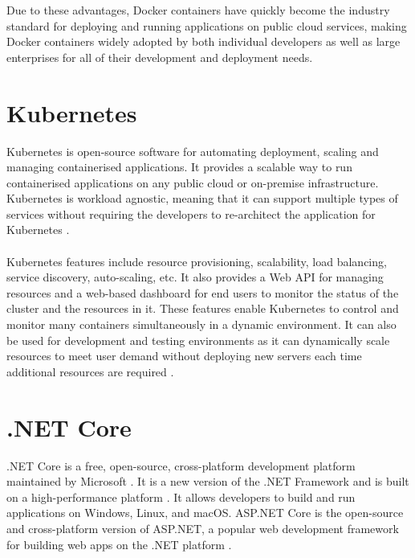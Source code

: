 \documentclass[BIF,Bachelor,nenglish]{twbook}%
\begin{document}
\noindent
Due to these advantages, Docker containers have quickly become the industry standard for deploying and running applications on public cloud services, making Docker containers widely adopted by both individual developers as well as large enterprises for all of their development and deployment needs.

\section{Kubernetes}
Kubernetes is open-source software for automating deployment, scaling and managing containerised applications. It provides a scalable way to run containerised applications on any public cloud or on-premise infrastructure. Kubernetes is workload agnostic, meaning that it can support multiple types of services without requiring the developers to re-architect the application for Kubernetes \cite{luk2018}.
\\
\\
Kubernetes features include resource provisioning, scalability, load balancing, service discovery, auto-scaling, etc. It also provides a Web \ac{API} for managing resources and a web-based dashboard for end users to monitor the status of the cluster and the resources in it. These features enable Kubernetes to control and monitor many containers simultaneously in a dynamic environment. It can also be used for development and testing environments as it can dynamically scale resources to meet user demand without deploying new servers each time additional resources are required \cite{kubernetes}.



\section{.NET Core}
.NET Core is a free, open-source, cross-platform development platform maintained by Microsoft \cite{dotnetintro}. It is a new version of the .NET Framework and is built on a high-performance platform \cite{dotnetintro}. It allows developers to build and run applications on Windows, Linux, and macOS. ASP.NET Core is the open-source and cross-platform version of ASP.NET, a popular web development framework for building web apps on the .NET platform \cite{dotnetaspcore}.
\end{document}
